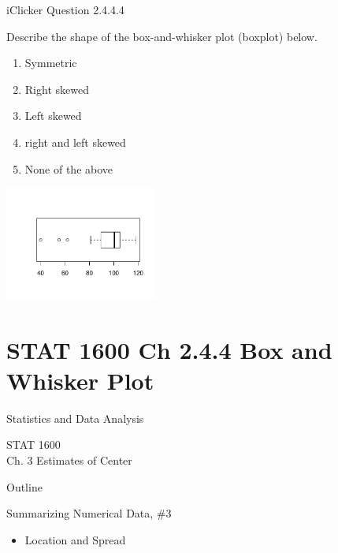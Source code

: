 \documentclass[14pt]{beamer}\usepackage[]{graphicx}\usepackage[]{color}
\begin{document}
\begin{frame}[fragile]{iClicker Question 2.4.4.4}

Describe the shape of the box-and-whisker plot (boxplot) below.

\begin{minipage}[ht]{5cm}

{\small{
\begin{enumerate}
\item Symmetric
\item Right skewed
\item Left skewed
\item right and left skewed
\item None of the above
\end{enumerate}
}}
\end{minipage}
\begin{minipage}[ht]{5.5cm}
  

\includegraphics[width=5cm]{figure/LBL2Ae-1} 

\end{minipage}
\end{frame}



\section{STAT 1600 Ch 2.4.4 Box and Whisker Plot}

\begin{frame}[fragile]{Statistics and Data Analysis}

STAT 1600 \\
Ch. 3 Estimates of Center

\end{frame}

\begin{frame}[fragile]{Outline}

Summarizing Numerical Data, \#3

\begin{itemize}
\item Location and Spread 
\end{itemize}
\end{frame}
\end{document}
